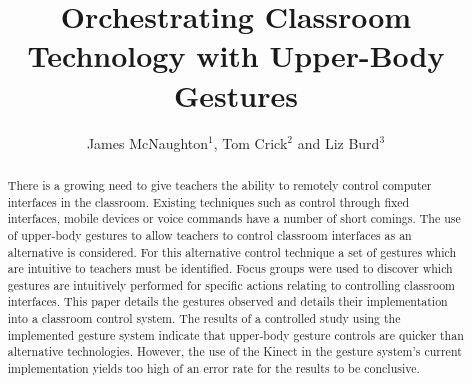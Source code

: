 \documentclass[link]{IWCOMP}
\begin{document}
\title{Orchestrating Classroom Technology with Upper-Body Gestures}

\author{James McNaughton$^{1}$, Tom Crick$^{2}$ and Liz Burd$^{3}$}



\begin{abstract}



There is a growing need to give teachers the ability to remotely control computer interfaces in the classroom.
Existing techniques such as control through fixed interfaces, mobile devices or voice commands have a number of short comings.
The use of upper-body gestures to allow teachers to control classroom interfaces as an alternative is considered.
For this alternative control technique a set of gestures which are intuitive to teachers must be identified.
Focus groups were used to discover which gestures are intuitively performed for specific actions relating to controlling classroom interfaces.
This paper details the gestures observed and details their implementation into a classroom control system.
The results of a controlled study using the implemented gesture system indicate that upper-body gesture controls are quicker than alternative technologies.
However, the use of the Kinect in the gesture system's current implementation yields too high of an error rate for the results to be conclusive.



\end{abstract}
\end{document}
